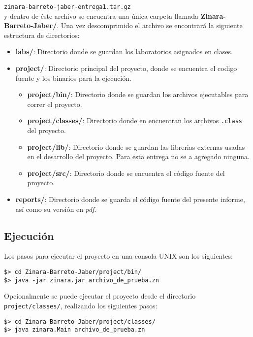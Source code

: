 \documentclass[12pt, spanish]{report}
\begin{document}
\texttt{zinara-barreto-jaber-entrega1.tar.gz}\\

y dentro de éste archivo se encuentra una única carpeta llamada
\textbf{Zinara-Barreto-Jaber/}. Una vez descomprimido el archivo se
encontrará la siguiente estructura de directorios:

\begin{itemize}
\item \textbf{labs/}: Directorio donde se guardan los laboratorios
  asignados en clases.
\item \textbf{project/}: Directorio principal del proyecto, donde se
  encuentra el codigo fuente y los binarios para la ejecución.
  \begin{itemize}
  \item \textbf{project/bin/}: Directorio donde se guardan los
    archivos ejecutables para correr el proyecto.
  \item \textbf{project/classes/}: Directorio donde en encuentran los
    archivos \texttt{.class} del proyecto.
  \item \textbf{project/lib/}: Directorio donde se guardan las
    librerias externas usadas en el desarrollo del proyecto. Para esta
    entrega no se a agregado ninguna.
  \item \textbf{project/src/}: Directorio donde se encuentra el código
    fuente del proyecto.
  \end{itemize}
\item \textbf{reports/}: Directorio donde se guarda el código fuente
  del presente informe, así como su versión en \emph{pdf}.
\end{itemize}

\subsection{Ejecución}
\label{sec:zejecucion}
Los pasos para ejecutar el proyecto en una consola UNIX son los
siguientes:

\begin{verbatim}
$> cd Zinara-Barreto-Jaber/project/bin/
$> java -jar zinara.jar archivo_de_prueba.zn
\end{verbatim}

Opcionalmente se puede ejecutar el proyecto desde el directorio
\texttt{project/classes/}, realizando los siguientes pasos:

\begin{verbatim}
$> cd Zinara-Barreto-Jaber/project/classes/
$> java zinara.Main archivo_de_prueba.zn
\end{verbatim}
\end{document}
